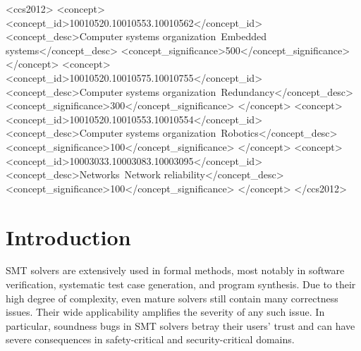 \documentclass[sigplan,screen]{acmart}
\begin{document}
\begin{CCSXML}
<ccs2012>
 <concept>
  <concept_id>10010520.10010553.10010562</concept_id>
  <concept_desc>Computer systems organization~Embedded systems</concept_desc>
  <concept_significance>500</concept_significance>
 </concept>
 <concept>
  <concept_id>10010520.10010575.10010755</concept_id>
  <concept_desc>Computer systems organization~Redundancy</concept_desc>
  <concept_significance>300</concept_significance>
 </concept>
 <concept>
  <concept_id>10010520.10010553.10010554</concept_id>
  <concept_desc>Computer systems organization~Robotics</concept_desc>
  <concept_significance>100</concept_significance>
 </concept>
 <concept>
  <concept_id>10003033.10003083.10003095</concept_id>
  <concept_desc>Networks~Network reliability</concept_desc>
  <concept_significance>100</concept_significance>
 </concept>
</ccs2012>
\end{CCSXML}



\maketitle

\section{Introduction}

SMT solvers are extensively used in formal methods, most notably in software verification, systematic test case generation, and program synthesis. Due to their high degree of complexity, even mature solvers still contain many correctness issues. Their wide applicability amplifies the severity of any such issue. In particular, soundness bugs in SMT solvers betray their users' trust and can have severe consequences in safety-critical and security-critical domains.
\end{document}
